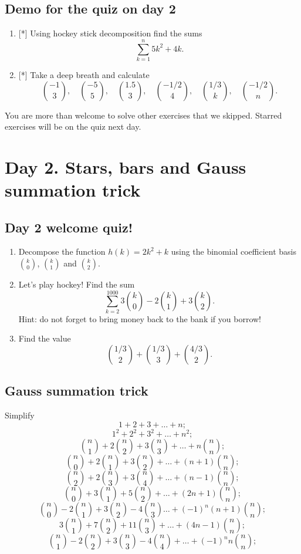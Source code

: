 \documentclass[12pt]{article}
\begin{document}
\subsection*{Demo for the quiz on day 2}

\begin{enumerate}

   \item  {[*]} Using hockey stick decomposition find the sums
    \[
    \sum_{k=1}^{n} {5k^2 + 4k}.
    \]

    \item {[*]} Take a deep breath and calculate 
\[
{-1 \choose 3}, \quad {-5 \choose 5},\quad  {1.5 \choose 3}, \quad  
{-1/2 \choose 4}, \quad  {1/3 \choose k}, \quad  {-1/2 \choose n}. 
\]
\end{enumerate}


You are more than welcome to solve other exercises that we skipped. Starred exercises will be on the quiz next day. 

\section{Day 2. Stars, bars and Gauss summation trick}

\subsection*{Day 2 welcome quiz!}

\begin{enumerate}
    \item Decompose the function $h(k) = 2k^2 + k$ using the binomial coefficient basis $k \choose 0$, $k \choose 1$ and $k \choose 2$.
    \item Let's play hockey! Find the sum 
    \[
    \sum_{k=2}^{1000} {3 {k \choose 0} - 2 {k \choose 1} + 3 {k \choose 2}}.
    \]
    Hint: do not forget to bring money back to the bank if you borrow!
    \item Find the value 
    \[
    {1/3 \choose 2} + {1/3 \choose 3} + {4/3 \choose 2}.
    \]
\end{enumerate}



\subsection*{Gauss summation trick}

\begin{exercise}
Simplify 
\[
1 + 2 + 3 + \dots + n;
\]
\[
1^2 + 2^2 + 3^2 + \dots + n^2;
\]
\[
{n \choose 1} + 2 {n \choose 2} + 3 {n \choose 3} + \dots + n{n \choose n};
\]
\[
{n \choose 0} + 2 {n \choose 1} + 3 {n \choose 2} + \dots + (n+1){n \choose n};
\]
\[
{n \choose 2} + 2 {n \choose 3} + 3 {n \choose 4} + \dots + (n-1){n \choose n};
\]
\[
{n \choose 0} + 3 {n \choose 1} + 5 {n \choose 2} + \dots + (2n+1){n \choose n};
\]
\[
{n \choose 0} - 2 {n \choose 1} + 3 {n \choose 2} - 4 {n \choose 3} \dots + (-1)^n (n+1){n \choose n};
\]
\[
3{n \choose 1} + 7 {n \choose 2} + 11 {n \choose 3} + \dots + (4n-1){n \choose n};
\]
\[
{n \choose 1} - 2 {n \choose 2} + 3 {n \choose 3} - 4 {n \choose 4} + \dots + (-1)^n n{n \choose n};
\]
\end{exercise}
\end{document}

